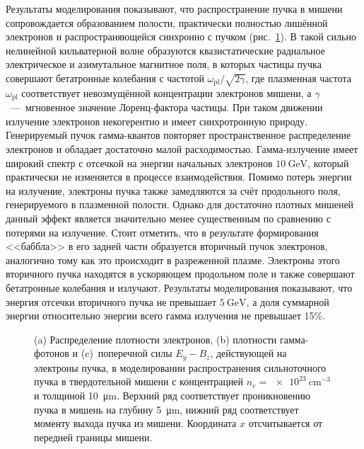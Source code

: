 Результаты моделирования показывают, что распространение пучка в мишени сопровождается образованием полости, практически полностью лишённой электронов и распространяющейся синхронно с пучком (рис.~\ref{fig:ch3/bubble}).
В такой сильно нелинейной кильватерной волне образуются квазистатические радиальное электрическое и азимутальное магнитное поля, в которых частицы пучка совершают бетатронные колебания с частотой $\omega_\mathrm{pl} / \sqrt{2\gamma}$, где плазменная частота $\omega_\mathrm{pl}$ соответствует невозмущённой концентрации электронов мишени, а $\gamma$~---~мгновенное значение Лоренц-фактора частицы.
При таком движении излучение электронов некогерентно и имеет синхротронную природу.
Генерируемый пучок гамма-квантов повторяет пространственное распределение электронов и обладает достаточно малой расходимостью.
Гамма-излучение имеет широкий спектр с отсечкой на энергии начальных электронов $\SI{10}{\giga\electronvolt}$, который практически не изменяется в процессе взаимодействия.
Помимо потерь энергии на излучение, электроны пучка также замедляются за счёт продольного поля, генерируемого в плазменной полости.
Однако для достаточно плотных мишеней данный эффект является значительно менее существенным по сравнению с потерями на излучение.
Стоит отметить, что в результате формирования <<баббла>> в его задней части образуется вторичный пучок электронов, аналогично тому как это происходит в разреженной плазме.
Электроны этого вторичного пучка находятся в ускоряющем продольном поле и также совершают бетатронные колебания и излучают.
Результаты моделирования показывают, что энергия отсечки вторичного пучка не превышает $\SI{5}{\giga\electronvolt}$, а доля суммарной энергии относительно энергии всего гамма излучения не превышает 15\%.

\begin{figure}
    \caption[Распределение плотности электронов, плотности гамма-фотонов и поперечной силы, действующей на электроны пучка, в моделировании процесса распространения сильноточного пучка в твердотельной мишени]{\label{fig:ch3/bubble} (a) Распределение плотности электронов, (b) плотности гамма-фотонов и (c)~поперечной силы ${E_y - B_z}$, действующей на электроны пучка, в моделировании распространения сильноточного пучка в твердотельной мишени с концентрацией ${n_e=\SI{e23}{\centi\meter^{-3}}}$ и толщиной \SI{10}{\um}. Верхний ряд соответствует проникновению пучка в мишень на глубину \SI{5}{\um}, нижний ряд соответствует моменту выхода пучка из мишени. Координата $x$ отсчитывается от передней границы мишени.}
\end{figure}

